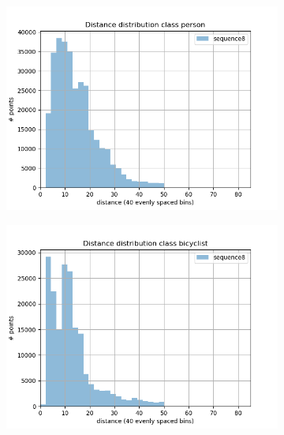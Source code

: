 \begin{figure}[h]
\begin{subfigure}[b]{0.24\textwidth}
         \includegraphics[width=\textwidth]{Figures/Chapter4/dist-height/dist/test/class6.png}
     \end{subfigure}
     \hfill
     \begin{subfigure}[b]{0.24\textwidth}
         \centering
         \includegraphics[width=\textwidth]{Figures/Chapter4/dist-height/dist/test/class7.png}
     \end{subfigure}
     \begin{subfigure}[b]{0.24\textwidth}
         \centering

\end{subfigure}
\end{figure}
